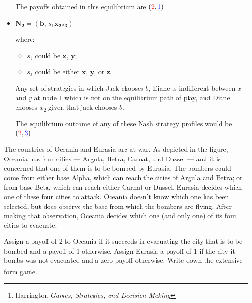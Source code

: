 \documentclass[addpoints ]{exam}
\begin{document}
\begin{questions}
\begin{solution}
\begin{parts}
\begin{itemize}
      The payoffs obtained in this equilibrium are $({\color{red} 2}, {\color{blue} 1})$

      \item 
        $\mathbf{N_2} = \left( \mathbf{b}, \ s_1 \mathbf{x_2} s_3 \right) $
      
      where:
      \begin{itemize}
          \item $s_1$ could be $\mathbf{x}$, $\mathbf{y}$; 
          \item $s_3$ could be either $\mathbf{x}$, $\mathbf{y}$, or $\mathbf{z}$.
      \end{itemize}

      Any set of strategies in which Jack chooses $b$,
      Diane is indifferent between $x$ and $y$ at node 1 which is not on the equilibrium path of play,
      and Diane chooses $x_2$ given that jack chooses $b$. 

      The equilibrium outcome of any of these Nash strategy profiles
      would be $({\color{red} 2}, {\color{blue} 3})$

    \end{itemize}

  \end{parts}

\begin{center}
  
\end{center}

\end{solution}

\newpage



\question[10] 
The countries of Oceania and Eurasia are at war.
As depicted in the figure, Oceania has four cities —
Argula, Betra, Carnat, and Dussel — 
and it is concerned that one of them is to be bombed by Eurasia.
The bombers could come from either base Alpha,
which can reach the cities of Argula and Betra;
or from base Beta, which can reach either Carnat or Dussel.
Eurasia decides which one of these four cities to attack.
Oceania doesn’t know which one has been selected,
but does observe the base from which the bombers are flying.
After making that observation, Oceania decides which one 
(and only one) of its four cities to evacuate.

Assign a payoff of 2 to Oceania
if it succeeds in evacuating the city that is to be bombed
and a payoff of 1 otherwise.
Assign Eurasia a payoff of 1 if the city it bombs was not evacuated
and a zero payoff otherwise.
Write down the extensive form game.
\footnote{Harrington \textit{Games, Strategies, and Decision Making}}


\end{questions}
\end{document}
